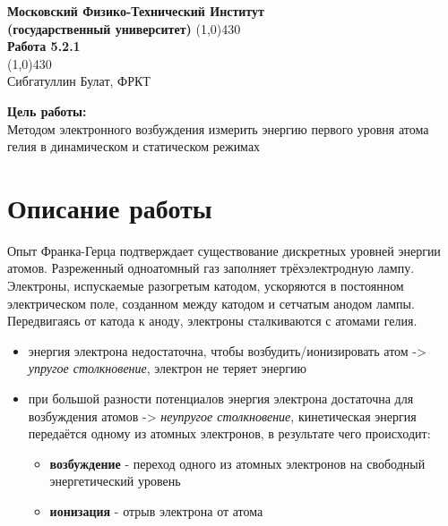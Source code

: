 \documentclass[a4paper, 12pt]{article}%
\begin{document}
\begin{titlepage}

\begin{center}
\large\textbf{Московский Физико-Технический Институт}\\
\large\textbf{(государственный университет)}
\vfill
\line(1,0){430}\\[1mm]
\huge\textbf{Работа 5.2.1}\\
\line(1,0){430}\\[1mm]
\vfill
\large Сибгатуллин Булат, ФРКТ\\
\end{center}

\end{titlepage}
\noindent \textbf{Цель работы:} \\
\indent Методом электронного возбуждения измерить энергию первого уровня атома гелия в динамическом и статическом режимах\\

\section*{Описание работы}
Опыт Франка-Герца подтверждает существование дискретных уровней энергии атомов. Разреженный одноатомный газ заполняет трёхэлектродную лампу. Электроны, испускаемые разогретым катодом, ускоряются в постоянном электрическом поле, созданном между катодом и сетчатым анодом лампы. Передвигаясь от катода к аноду, электроны сталкиваются с атомами гелия.
\begin{itemize}
    \item энергия электрона недостаточна, чтобы возбудить/ионизировать атом -> \textit{упругое столкновение}, электрон не теряет энергию
    \item при большой разности потенциалов энергия электрона достаточна для возбуждения атомов -> \textit{неупругое столкновение}, кинетическая энергия передаётся одному из атомных электронов, в результате чего происходит:
    \begin{itemize}
        \item \textbf{возбуждение} - переход одного из атомных электронов на свободный энергетический уровень
        \item \textbf{ионизация} - отрыв электрона от атома 
    \end{itemize}
\end{itemize}
\end{document}
